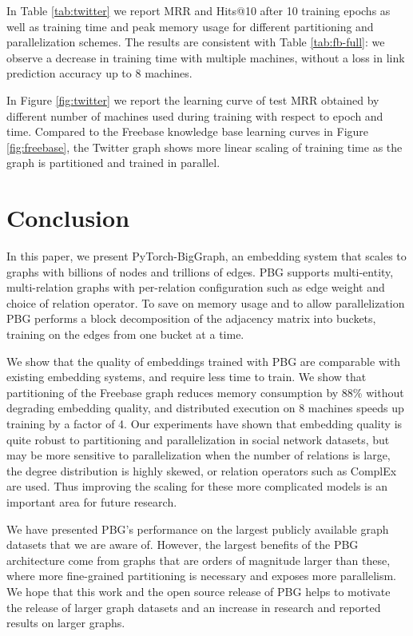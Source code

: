 \documentclass{article}
\begin{document}
In Table \ref{tab:twitter} we report MRR and Hits@10 after 10 training epochs as well as training time and peak memory usage for different partitioning and parallelization schemes. The results are consistent with Table \ref{tab:fb-full}: we observe a decrease in training time with multiple machines, without a loss in link prediction accuracy up to 8 machines.

In Figure \ref{fig:twitter} we report the learning curve of test MRR obtained by different number of machines used during training with respect to epoch and time. Compared to the Freebase knowledge base learning curves in Figure \ref{fig:freebase}, the Twitter graph shows more linear scaling of training time as the graph is partitioned and trained in parallel.



\section{Conclusion}
In this paper, we present PyTorch-BigGraph, an embedding system that scales to graphs with billions of nodes and trillions of edges. PBG supports multi-entity, multi-relation graphs with per-relation configuration such as edge weight and choice of relation operator. To save on memory usage and to allow parallelization PBG performs a block decomposition of the adjacency matrix into  buckets, training on the edges from one bucket at a time. 

We show that the quality of embeddings trained with PBG are comparable with existing embedding systems, and require less time to train. We show that partitioning of the Freebase graph reduces memory consumption by 88\% without degrading embedding quality, and distributed execution on 8 machines speeds up training by a factor of 4. Our experiments have shown that embedding quality is quite robust to partitioning and parallelization in social network datasets, but may be more sensitive to parallelization when the number of relations is large, the degree distribution is highly skewed, or relation operators such as ComplEx are used. Thus improving the scaling for these more complicated models is an important area for future research.





We have presented PBG's performance on the largest publicly available graph datasets that we are aware of. However, the largest benefits of the PBG architecture come from graphs that are  orders of magnitude larger than these, where more fine-grained partitioning is necessary and exposes more parallelism. We hope that this work and the open source release of PBG helps to motivate the release of larger graph datasets and an increase in research and reported results on larger graphs.
\end{document}
